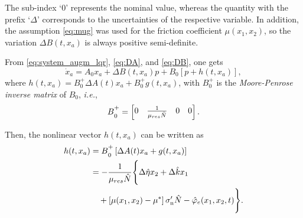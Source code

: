 \documentclass[journal,twoside,web]{ieeecolor}
\begin{document}
The sub-index `0' represents the nominal value, whereas the quantity with the prefix `$\Delta$' corresponds to the uncertainties of the respective variable. In addition, the assumption \eqref{eq:mug} was used for the friction coefficient $\mu(x_1,x_2)$, so the variation $\Delta B (t,x_a)$ is always positive semi-definite.

From \eqref{eq:system_augm_lqr}, \eqref{eq:DA}, and \eqref{eq:DB}, one gets
\begin{equation}
\displaystyle
\dot{x}_a = A_0x_a + \Delta B(t,x_a)p + B_0 \left[p + h(t,x_a)\right],
\label{eq:system_mu_lqr}
\end{equation}
where $\displaystyle h(t,x_a) = B_0^+ \Delta A(t)x_a + B_0^+ g(t,x_a)$, with $\displaystyle B_0^+$ is the \textit{Moore-Penrose inverse matrix} of $\displaystyle B_0$, \textit{i.e.},
\begin{equation}
\displaystyle
B\strut^+_0=\begin{bmatrix}
0 & \frac{1}{\mu_{res} \hat{N}} & 0 & 0
\end{bmatrix}.
\label{eq:B0+}
\end{equation}

Then, the nonlinear vector $h(t,x_a)$ can be written as
\begin{equation}
\begin{split}
h(t,x_a) &= B\strut^+_0 \left[\Delta A(t) x_a + g(t,x_a) \right] \\
&= -\frac{1}{\mu_{res} \hat{N}} \Bigg\{\Delta \hat{\eta} x_2 + \Delta \hat{k} x_1 \\ &\quad + \left[ \mu(x_1,x_2) - \mu^* \right]  \sigma'_{\mathrm{n}} \hat{N} -\hat{\varphi}_e(x_1,x_2,t)\Bigg\}.
\end{split}
\end{equation}
\end{document}
